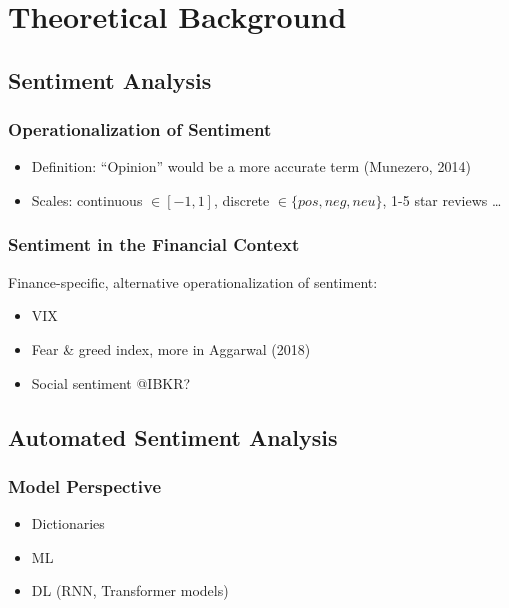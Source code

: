 \section{Theoretical Background}



\subsection{Sentiment Analysis}  %

\subsubsection{Operationalization of Sentiment}
\begin{itemize}[noitemsep]
	\item Definition: ``Opinion'' would be a more accurate term (Munezero, 2014)
	\item Scales: continuous $\in [-1, 1]$, discrete $\in \{pos, neg, neu\}$, 1-5 star reviews \dots
\end{itemize}

\subsubsection{Sentiment in the Financial Context}

Finance-specific, alternative operationalization of sentiment:
\begin{itemize}[noitemsep]
	\item VIX
	\item Fear \& greed index, more in Aggarwal (2018)
	\item Social sentiment @IBKR?
	
\end{itemize}

\subsection{Automated Sentiment Analysis}


\subsubsection{Model Perspective}
\begin{itemize}[noitemsep]
	\item Dictionaries
	\item ML
	\item DL (RNN, Transformer models)
\end{itemize}

